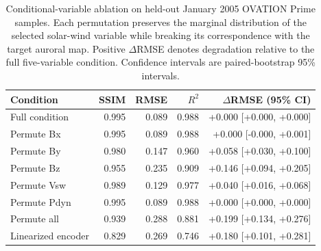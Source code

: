 \begin{table}[htbp]
\centering
\caption{Conditional-variable ablation on held-out January 2005 OVATION Prime samples. Each permutation preserves the marginal distribution of the selected solar-wind variable while breaking its correspondence with the target auroral map. Positive $\Delta$RMSE denotes degradation relative to the full five-variable condition. Confidence intervals are paired-bootstrap 95\% intervals.}
\label{tab:condition_ablation}
\begin{tabular}{lrrrr}
\hline
Condition & SSIM & RMSE & $R^2$ & $\Delta$RMSE (95\% CI) \\
\hline
Full condition & 0.995 & 0.089 & 0.988 & +0.000 [+0.000, +0.000] \\
Permute Bx & 0.995 & 0.089 & 0.988 & +0.000 [-0.000, +0.001] \\
Permute By & 0.980 & 0.147 & 0.960 & +0.058 [+0.030, +0.100] \\
Permute Bz & 0.955 & 0.235 & 0.909 & +0.146 [+0.094, +0.205] \\
Permute Vsw & 0.989 & 0.129 & 0.977 & +0.040 [+0.016, +0.068] \\
Permute Pdyn & 0.995 & 0.089 & 0.988 & +0.000 [+0.000, +0.000] \\
Permute all & 0.939 & 0.288 & 0.881 & +0.199 [+0.134, +0.276] \\
Linearized encoder & 0.829 & 0.269 & 0.746 & +0.180 [+0.101, +0.281] \\
\hline
\end{tabular}
\end{table}
